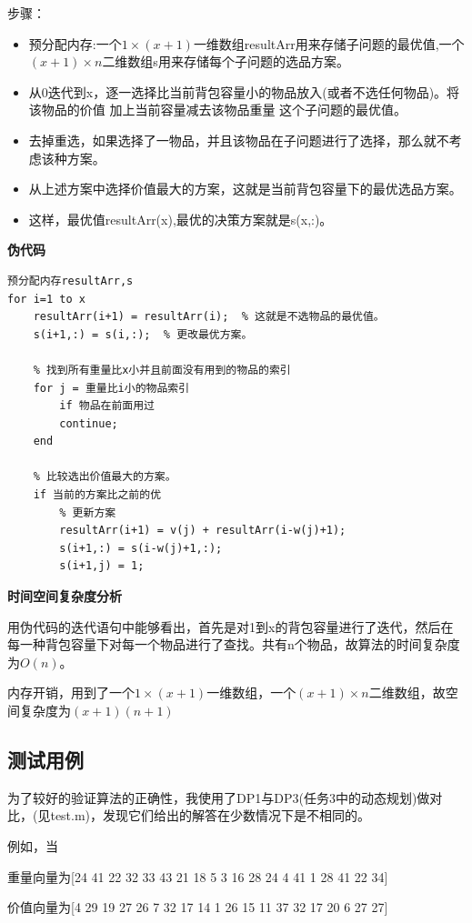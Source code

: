 \documentclass[UTF8]{ctexart}
\begin{document}
步骤：
\begin{itemize}
	\item 预分配内存:一个\( 1×(x+1) \)一维数组resultArr用来存储子问题的最优值,一个\( (x+1)×n \)二维数组s用来存储每个子问题的选品方案。
	\item 从0迭代到x，逐一选择比当前背包容量小的物品放入(或者不选任何物品)。将该物品的价值 加上当前容量减去该物品重量 这个子问题的最优值。
	\item 去掉重选，如果选择了一物品，并且该物品在子问题进行了选择，那么就不考虑该种方案。
	\item 从上述方案中选择价值最大的方案，这就是当前背包容量下的最优选品方案。
    \item 这样，最优值resultArr(x),最优的决策方案就是s(x,:)。
\end{itemize}
\textbf{伪代码}
\begin{lstlisting}
预分配内存resultArr,s
for i=1 to x
    resultArr(i+1) = resultArr(i);  % 这就是不选物品的最优值。
    s(i+1,:) = s(i,:);  % 更改最优方案。
	
    % 找到所有重量比x小并且前面没有用到的物品的索引
    for j = 重量比i小的物品索引
        if 物品在前面用过
        continue;
    end

    % 比较选出价值最大的方案。
    if 当前的方案比之前的优
        % 更新方案
        resultArr(i+1) = v(j) + resultArr(i-w(j)+1);
        s(i+1,:) = s(i-w(j)+1,:); 
        s(i+1,j) = 1;
\end{lstlisting}
\textbf{时间空间复杂度分析}

用伪代码的迭代语句中能够看出，首先是对1到x的背包容量进行了迭代，然后在每一种背包容量下对每一个物品进行了查找。共有n个物品，故算法的时间复杂度为\(O(n)\)。

内存开销，用到了一个\( 1×(x+1) \)一维数组，一个\( (x+1)×n \)二维数组，故空间复杂度为\( (x+1)(n+1)  \)

\subsection{测试用例}
为了较好的验证算法的正确性，我使用了DP1与DP3(任务3中的动态规划)做对比，(见test.m)，发现它们给出的解答在少数情况下是不相同的。

例如，当

重量向量为[24    41    22    32    33    43    21    18     5     3    16    28    24     4    41     1    28    41    22    34]

价值向量为[4    29    19    27    26     7    32    17    14     1    26    15    11    37    32    17    20     6    27    27]
\end{document}
